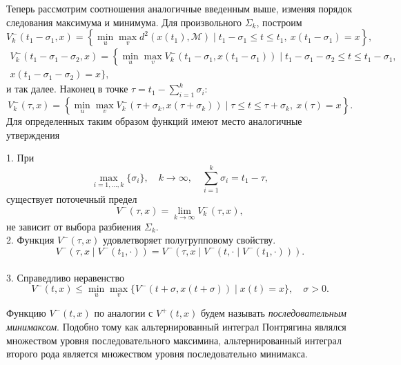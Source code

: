 Теперь рассмотрим соотношения аналогичные введенным выше, изменяя порядок следования максимума и минимума.
 Для произвольного \( \Sigma_k \), построим
\begin{equation*}
    V_k^-(t_1 - \sigma_1, x) = \left\{ \min_u \max_v  d^2(x(t_1), \mathcal{M}) \mid t_1 -
     \sigma_1 \le t \le t_1, \ x(t_1 - \sigma_1) = x \right\},
\end{equation*}
\begin{multline*} 
    V_k^-(t_1 - \sigma_1 - \sigma_2, x) = \left\{ \min_u \max_v  V_k^-(t_1 - \sigma_1, x(t_1 -
     \sigma_1)) \mid t_1 - \sigma_1 - \sigma_2 \le t \le t_1 - \sigma_1, \right. \\ 
    x(t_1 - \sigma_1 - \sigma_2) = x \Big\},
\end{multline*}
и так далее. Наконец в точке \( \tau = t_1 - \sum\limits_{i = 1}^k \sigma_i \):
\begin{equation*}
    V_k^-(\tau, x) = \left\{ \min_u \max_v  V_k^- (\tau + \sigma_k, x(\tau + \sigma_k)) \mid
     \tau \le t \le \tau + \sigma_k, \ x(\tau) = x \right\}.
\end{equation*}
Для определенных таким образом функций имеют место аналогичные утверждения
\begin{lemma}
    1. При
    \[ 
        \max_{i = 1,\dots,k} \{\sigma_i\}, \quad k \to \infty, \quad \sum_{i = 1}^k \sigma_i = 
         t_1 - \tau, 
    \]
    существует поточечный предел
    \[
        V^-(\tau, x) = \lim_{k \to \infty} V_k^-(\tau, x),
    \]
    не зависит от выбора разбиения \( \Sigma_k \). \\
    2. Функция \( V^-(\tau, x) \) удовлетворяет полугрупповому свойству.
    \begin{equation*}
        V^-(\tau, x \mid V^-(t_1, \cdot)) = V^-(\tau, x \mid V^-(t, \cdot \mid V^-(t_1, \cdot))).
    \end{equation*} \\
    3. Справедливо неравенство
    \begin{equation*}
        V^-(t,x) \le \min_u \max_v \{ V^-(t + \sigma, x(t + \sigma)) \mid x(t) = x \}, 
         \quad \sigma > 0.
    \end{equation*}
\end{lemma}
Функцию \( V^-(t,x) \) по аналогии с \( V^+(t,x) \) будем называть \emph{последовательным минимаксом}.
Подобно тому как альтернированный интеграл Понтрягина являлся множеством уровня последовательного максимина,
альтернированный интеграл второго рода является множеством уровня последовательно минимакса. 


